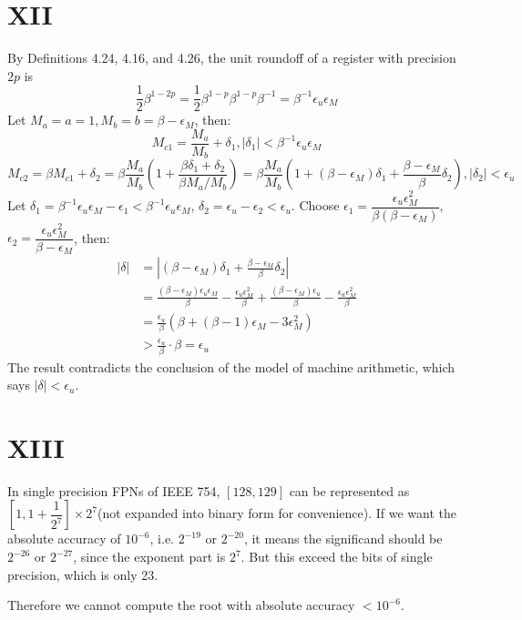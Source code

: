 \documentclass[a4paper]{article}
\begin{document}
\section*{XII}
By Definitions 4.24, 4.16, and 4.26, the unit roundoff of a register with precision $2p$ is
$$
\frac{1}{2}\beta^{1-2p} = \frac{1}{2} \beta^{1-p} \beta^{1-p} \beta^{-1} = \beta^{-1} \epsilon_u \epsilon_M
$$
Let $M_a = a = 1, M_b = b = \beta - \epsilon_M$, then:
$$
M_{c1} = \frac{M_a}{M_b} + \delta_1, |\delta_1| < \beta^{-1} \epsilon_u \epsilon_M
$$
$$
M_{c2} = \beta M_{c1} + \delta_2 = \beta \frac{M_a}{M_b}(1 + \frac{\beta\delta_1 + \delta_2}{\beta M_a/M_b}) = \beta \frac{M_a}{M_b}(1 + (\beta-\epsilon_M)\delta_1 + \frac{\beta - \epsilon_M}{\beta}\delta_2), |\delta_2| < \epsilon_u
$$
Let $\delta_1 = \beta^{-1} \epsilon_u \epsilon_M - \epsilon_1 < \beta^{-1} \epsilon_u \epsilon_M$, $\delta_2 = \epsilon_u - \epsilon_2 < \epsilon_u$. Choose $\epsilon_1 = \dfrac{\epsilon_u\epsilon_M^2}{\beta(\beta-\epsilon_M)}$, 
$\epsilon_2 = \dfrac{\epsilon_u\epsilon_M^2}{\beta-\epsilon_M}$, then:
\begin{align*}
  |\delta| &= |(\beta-\epsilon_M)\delta_1 + \frac{\beta - \epsilon_M}{\beta}\delta_2| \\
  &= \frac{(\beta - \epsilon_M)\epsilon_u\epsilon_M}{\beta} - \frac{\epsilon_u\epsilon_M^2}{\beta} + \frac{(\beta - \epsilon_M)\epsilon_u}{\beta} - \frac{\epsilon_u\epsilon_M^2}{\beta} \\
  &= \frac{\epsilon_u}{\beta}(\beta + (\beta - 1)\epsilon_M - 3\epsilon_M^2) \\
  &> \frac{\epsilon_u}{\beta}\cdot\beta
  = \epsilon_u
\end{align*}
The result contradicts the conclusion of the model of machine arithmetic, which says $|\delta| < \epsilon_u$.



\section*{XIII}
In single precision FPNs of IEEE 754, $[128,129]$ can be represented as $[1,1+\dfrac{1}{2^7}]\times 2^7$(not expanded into binary form for convenience). If we want the absolute accuracy of $10^{-6}$, i.e. $2^{-19}$ or $2^{-20}$, it means the significand should be 
$2^{-26}$ or $2^{-27}$, since the exponent part is $2^7$. But this exceed the bits of single precision, which is only 23.

Therefore we cannot compute the root with absolute accuracy $< 10^{-6}$.
\end{document}
